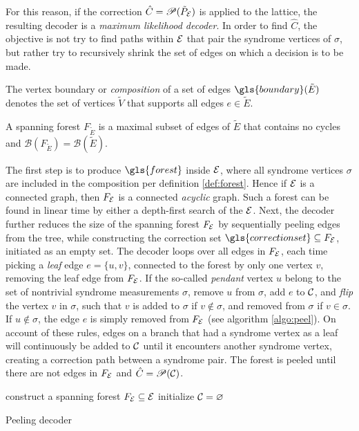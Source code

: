 For this reason, if the correction $\hat{C}=\mathscr{P}(\tilde{P}_{\mathcal{E}})$ is applied to the lattice, the resulting decoder is a \emph{maximum likelihood decoder}. In order to find $\hat{C}$, the objective is not try to find paths within $\mathcal{E}$ that pair the syndrome vertices of $\sigma$, but rather try to recursively shrink the set of edges on which a decision is to be made.
\begin{definition}\label{def:boundaryofedges}
  The vertex boundary or \emph{composition} of a set of edges $\gls{boundary}(\tilde{E})$ denotes the set of vertices $\tilde{V}$ that supports all edges $e\in \tilde{E}$.
\end{definition}
\begin{definition}\label{def:forest}
  A spanning forest $F_{\tilde{E}}$ is a maximal subset of edges of $\tilde{E}$ that contains no cycles and $\mathscr{B}(F_{\tilde{E}}) = \mathscr{B}(\tilde{E})$.
\end{definition}
The first step  is to produce $\gls{forest}$ inside $\mathcal{E}$, where all syndrome vertices $\sigma$ are included in the composition per definition \ref{def:forest}. Hence if $\mathcal{E}$ is a connected graph, then $F_{\mathcal{E}}$ is a connected \emph{acyclic} graph. Such a forest can be found in linear time by either a depth-first search of the $\mathcal{E}$. Next, the decoder further reduces the size of the spanning forest $F_{\mathcal{E}}$ by sequentially peeling edges from the tree, while constructing the correction set $\gls{correctionset}\subseteq F_\m{E}$, initiated as an empty set. The decoder loops over all edges in $F_{\mathcal{E}}$, each time picking a \emph{leaf} edge $e = \{u,v\}$, connected to the forest by only one vertex $v$, removing the leaf edge from $F_{\mathcal{E}}$. If the so-called \emph{pendant} vertex $u$ belong to the set of nontrivial syndrome measurements $\sigma$, remove $u$ from $\sigma$, add $e$ to $\mathcal{C}$, and \emph{flip} the vertex $v$ in $\sigma$, such that $v$ is added to $\sigma$ if $v \notin \sigma$, and removed from $\sigma$ if $v\in\sigma$.  If $u\notin\sigma$, the edge $e$ is simply removed from $F_{\mathcal{E}}$ (see algorithm \ref{algo:peel}). On account of these rules, edges on a branch that had a syndrome vertex as a leaf will continuously be added to $\mathcal{C}$ until it encounters another syndrome vertex, creating a correction path between a syndrome pair. The forest is peeled until there are not edges in $F_{\mathcal{E}}$ and $\hat{C}=\mathscr{P}(\mathcal{C})$.

\begin{algorithm}[h]
  \BlankLine
  \BlankLine
  construct a spanning forest $F_{\mathcal{E}} \subseteq\mathcal{E}$\;
  initialize $\mathcal{C} = {\varnothing}$\;
  \BlankLine
  \caption{Peeling decoder \cite{delfosse2017linear}}\label{algo:peel}
\end{algorithm}


